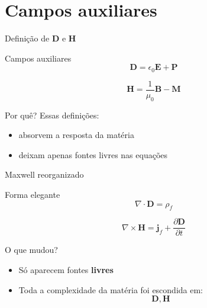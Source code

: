 \documentclass[aspectratio=169]{beamer}
\begin{document}

\section{Campos auxiliares}

\begin{frame}{Definição de \(\mathbf{D}\) e \(\mathbf{H}\)}

\begin{block}{Campos auxiliares}
\begin{equation}
\mathbf{D} = \epsilon_0 \mathbf{E} + \mathbf{P}
\end{equation}

\begin{equation}
\mathbf{H} = \frac{1}{\mu_0}\mathbf{B} - \mathbf{M}
\end{equation}
\end{block}

\pause

\begin{alertblock}{Por quê?}
Essas definições:
\begin{itemize}
\item absorvem a resposta da matéria
\item deixam apenas fontes livres nas equações
\end{itemize}
\end{alertblock}

\end{frame}


\begin{frame}{Maxwell reorganizado}

\begin{block}{Forma elegante}
\begin{equation}
\nabla \cdot \mathbf{D} = \rho_f
\end{equation}

\begin{equation}
\nabla \times \mathbf{H} =
\mathbf{j}_f + \frac{\partial \mathbf{D}}{\partial t}
\end{equation}
\end{block}

\pause

\begin{block}{O que mudou?}
\begin{itemize}
\item Só aparecem fontes \textbf{livres}
\item Toda a complexidade da matéria foi escondida em:
\[
\mathbf{D}, \mathbf{H}
\]
\end{itemize}
\end{block}

\end{frame}
\end{document}
